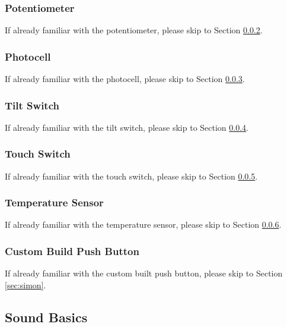 \documentclass[12pt,letterpaper,oneside]{article}
\begin{document}
			\subsubsection{Potentiometer} \label{sec:potentiometer}
			If already familiar with the potentiometer, please skip to Section \ref{sec:photocell}. 
			
			\subsubsection{Photocell} \label{sec:photocell}
			If already familiar with the photocell, please skip to Section \ref{sec:tilt}. 
			
			\subsubsection{Tilt Switch} \label{sec:tilt}
			If already familiar with the tilt switch, please skip to Section \ref{sec:touch}. 

			\subsubsection{Touch Switch} \label{sec:touch}
			If already familiar with the touch switch, please skip to Section \ref{sec:temp}. 
				
			\subsubsection{Temperature Sensor} \label{sec:temp}
			If already familiar with the temperature sensor, please skip to Section \ref{sec:push}. 
			
			\subsubsection{Custom Build Push Button} \label{sec:push}
			If already familiar with the custom built push button, please skip to Section \ref{sec:simon}. 
						
			\subsection{Sound Basics} \label{sec:sound}
\end{document}
